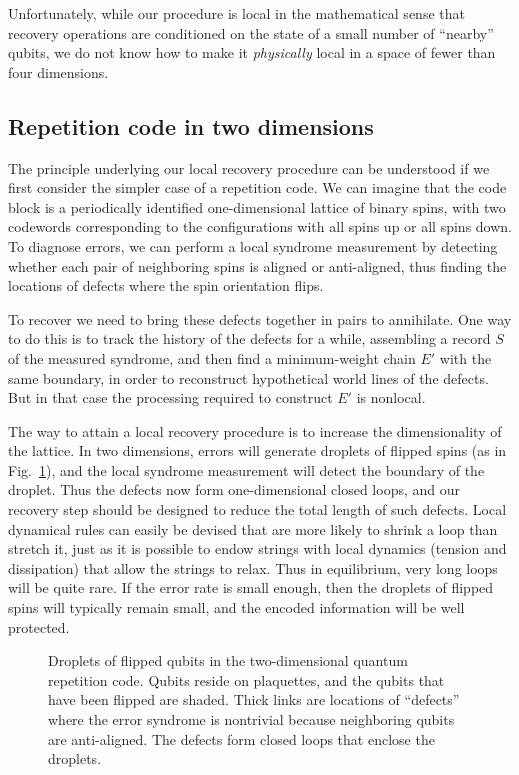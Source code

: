 Unfortunately, while our procedure is local in the mathematical sense that
recovery operations are conditioned on the state of a small number of
``nearby'' qubits, we do not know how to make it {\em physically} local in a
space of fewer than four dimensions.


\subsection{Repetition code in two dimensions}
The principle underlying our local recovery procedure can be understood if we
first consider the simpler case of a repetition code.  We can imagine
that the code block is a periodically identified one-dimensional lattice of
binary spins, with two codewords corresponding to the configurations with all
spins up or all spins down.  To diagnose errors, we can perform a local
syndrome measurement by detecting whether each pair of neighboring spins is aligned or
anti-aligned, thus finding the locations of defects where the spin orientation
flips.

To recover we need to bring these defects together in pairs to annihilate.  One
way to do this is to track the history of the defects for a while, assembling a
record $S$ of the measured syndrome, and then find a minimum-weight
chain $E'$ with the same boundary, in order to reconstruct hypothetical world lines
of the defects.  But in that case the processing required to construct $E'$ is nonlocal.

The way to attain a local recovery procedure is to increase the dimensionality
of the lattice. In two dimensions, errors will generate droplets of flipped
spins (as in Fig.~\ref{fig_droplets}), and the local syndrome measurement will detect the boundary of the
droplet.  Thus the defects now form one-dimensional closed loops, and our
recovery step should be designed to reduce the total length of such defects.
Local dynamical rules can easily be devised that are more likely to shrink a loop than
stretch it, just as it is possible to endow strings with local dynamics (tension and
dissipation) that allow the strings to relax.  Thus in equilibrium, very long
loops will be quite rare. If the error rate is small enough, then the droplets
of flipped spins will typically remain small, and the encoded information will
be well protected.

\begin{figure}
\begin{center}
\leavevmode
\epsfxsize=3in
\end{center}
\caption{Droplets of flipped qubits in the two-dimensional quantum repetition code. Qubits reside on plaquettes, and the qubits that have been flipped are shaded. Thick links are locations of ``defects'' where the error syndrome is nontrivial because neighboring qubits are anti-aligned. The defects form closed loops that enclose the droplets.} 
\label{fig_droplets}
\end{figure}

